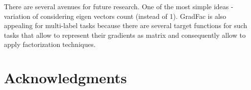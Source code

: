 \documentclass{article}
\begin{document}
There are several avenues for future research. One of the most simple ideas - variation of considering eigen vectors count (instead of 1). GradFac is also appealing for multi-label tasks because there are several target functions for such tasks \cite{Tsoumakas07multi-labelclassification} that allow to represent their gradients as matrix and consequently allow to apply factorization techniques.

\section*{Acknowledgments} 



\nocite{Hastie_theelements}
\nocite{GLM}
\nocite{Friedman98additivelogistic}
\nocite{Friedman00greedyfunction}
\nocite{Zhao_sparseoutput}
\nocite{Allwein00reducingmulticlass}
\nocite{Crammer00onthe}
\nocite{Rifkin04indefense}
\nocite{Lee01algorithmsfor}
\nocite{Koren09matrixfactorization}
\nocite{Hu08collaborativefiltering}
\nocite{Gulin_winningthe}
\nocite{Eckart1936}
\nocite{elasticnet05}
\nocite{Efron1992bootstrap}
\nocite{uciRepo}



\end{document}
